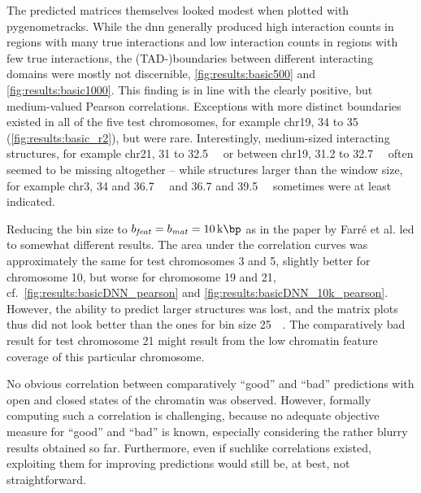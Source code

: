The predicted matrices themselves looked modest when plotted with pygenometracks. 
While the \acrshort{dnn} generally produced high interaction counts in regions with many true interactions
and low interaction counts in regions with few true interactions, the (TAD-)boundaries between different interacting domains 
were mostly not discernible, \cref{fig:results:basic500} and \ref{fig:results:basic1000}.
This finding is in line with the clearly positive, but medium-valued Pearson correlations.
Exceptions with more distinct boundaries existed in all of the five test chromosomes,
for example chr19, 34 to \SI{35}{\kilo\bp} (\cref{fig:results:basic_r2}), but were rare. 
Interestingly, medium-sized interacting structures, for example chr21, 31 to \SI{32.5}{\kilo\bp} 
or between chr19, 31.2 to \SI{32.7}{\kilo\bp} often seemed to be missing altogether -- 
while structures larger than the window size, for example chr3, 34 and \SI{36.7}{\kilo\bp} and 36.7 and \SI{39.5}{\kilo\bp}
sometimes were at least indicated.

Reducing the bin size to $b_\mathit{feat}=b_\mathit{mat}=\SI{10}{\kilo\bp}$ as in the paper by Farr\'e et al. \cite{Farre2018a} 
led to somewhat different results.
The area under the correlation curves was approximately the same for test chromosomes 3 and 5, slightly better for chromosome 10, but worse for chromosome 19 and 21,
cf.~\cref{fig:results:basicDNN_pearson} and \ref{fig:results:basicDNN_10k_pearson}.
However, the ability to predict larger structures was lost, and the matrix plots thus did not look better than the ones for bin size \SI{25}{\kilo\bp}.
The comparatively bad result for test chromosome 21 might result from the low chromatin feature coverage of this particular chromosome.

No obvious correlation between comparatively ``good'' and ``bad'' predictions with open and closed states of the chromatin was observed.
However, formally computing such a correlation is challenging, because no adequate objective measure for ``good'' and ``bad'' is known, 
especially considering the rather blurry results obtained so far.
Furthermore, even if suchlike correlations existed, exploiting them for improving predictions would still be, at best, not straightforward.

